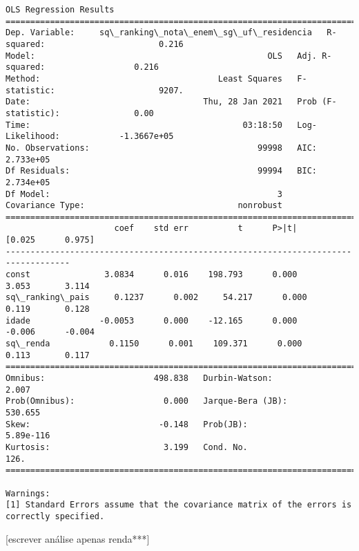 \documentclass[11pt]{article}
\begin{document}
    \begin{Verbatim}[commandchars=\\\{\}]
                                      OLS Regression Results                                     
=================================================================================================
Dep. Variable:     sq\_ranking\_nota\_enem\_sg\_uf\_residencia   R-squared:                       0.216
Model:                                               OLS   Adj. R-squared:                  0.216
Method:                                    Least Squares   F-statistic:                     9207.
Date:                                   Thu, 28 Jan 2021   Prob (F-statistic):               0.00
Time:                                           03:18:50   Log-Likelihood:            -1.3667e+05
No. Observations:                                  99998   AIC:                         2.733e+05
Df Residuals:                                      99994   BIC:                         2.734e+05
Df Model:                                              3                                         
Covariance Type:                               nonrobust                                         
===================================================================================
                      coef    std err          t      P>|t|      [0.025      0.975]
-----------------------------------------------------------------------------------
const               3.0834      0.016    198.793      0.000       3.053       3.114
sq\_ranking\_pais     0.1237      0.002     54.217      0.000       0.119       0.128
idade              -0.0053      0.000    -12.165      0.000      -0.006      -0.004
sq\_renda            0.1150      0.001    109.371      0.000       0.113       0.117
==============================================================================
Omnibus:                      498.838   Durbin-Watson:                   2.007
Prob(Omnibus):                  0.000   Jarque-Bera (JB):              530.655
Skew:                          -0.148   Prob(JB):                    5.89e-116
Kurtosis:                       3.199   Cond. No.                         126.
==============================================================================

Warnings:
[1] Standard Errors assume that the covariance matrix of the errors is correctly specified.

    \end{Verbatim}

    {[}escrever análise apenas renda***{]}
\end{document}
